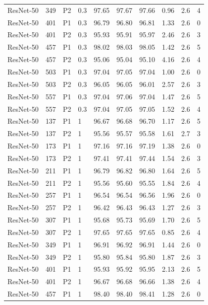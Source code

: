{\begin{longtable}{lrllrrrrrr}
ResNet-50 & 349 & P2 & 0.3 & 97.65 & 97.67 & 97.66 & 0.96 & 2.6 & 4 \\
ResNet-50 & 401 & P1 & 0.3 & 96.79 & 96.80 & 96.81 & 1.33 & 2.6 & 0 \\
ResNet-50 & 401 & P2 & 0.3 & 95.93 & 95.91 & 95.97 & 2.46 & 2.6 & 3 \\
ResNet-50 & 457 & P1 & 0.3 & 98.02 & 98.03 & 98.05 & 1.42 & 2.6 & 5 \\
ResNet-50 & 457 & P2 & 0.3 & 95.06 & 95.04 & 95.10 & 4.16 & 2.6 & 4 \\
ResNet-50 & 503 & P1 & 0.3 & 97.04 & 97.05 & 97.04 & 1.00 & 2.6 & 0 \\
ResNet-50 & 503 & P2 & 0.3 & 96.05 & 96.05 & 96.01 & 2.57 & 2.6 & 3 \\
ResNet-50 & 557 & P1 & 0.3 & 97.04 & 97.06 & 97.04 & 1.47 & 2.6 & 5 \\
ResNet-50 & 557 & P2 & 0.3 & 97.04 & 97.05 & 97.05 & 1.52 & 2.6 & 4 \\
ResNet-50 & 137 & P1 & 1 & 96.67 & 96.68 & 96.70 & 1.17 & 2.6 & 5 \\
ResNet-50 & 137 & P2 & 1 & 95.56 & 95.57 & 95.58 & 1.61 & 2.7 & 3 \\
ResNet-50 & 173 & P1 & 1 & 97.16 & 97.16 & 97.19 & 1.38 & 2.6 & 0 \\
ResNet-50 & 173 & P2 & 1 & 97.41 & 97.41 & 97.44 & 1.54 & 2.6 & 3 \\
ResNet-50 & 211 & P1 & 1 & 96.79 & 96.82 & 96.80 & 1.64 & 2.6 & 5 \\
ResNet-50 & 211 & P2 & 1 & 95.56 & 95.60 & 95.55 & 1.84 & 2.6 & 4 \\
ResNet-50 & 257 & P1 & 1 & 96.54 & 96.54 & 96.56 & 1.96 & 2.6 & 0 \\
ResNet-50 & 257 & P2 & 1 & 96.42 & 96.43 & 96.43 & 1.27 & 2.6 & 3 \\
ResNet-50 & 307 & P1 & 1 & 95.68 & 95.73 & 95.69 & 1.70 & 2.6 & 5 \\
ResNet-50 & 307 & P2 & 1 & 97.65 & 97.65 & 97.65 & 0.85 & 2.6 & 4 \\
ResNet-50 & 349 & P1 & 1 & 96.91 & 96.92 & 96.91 & 1.44 & 2.6 & 0 \\
ResNet-50 & 349 & P2 & 1 & 95.80 & 95.84 & 95.80 & 1.87 & 2.6 & 3 \\
ResNet-50 & 401 & P1 & 1 & 95.93 & 95.92 & 95.95 & 2.13 & 2.6 & 5 \\
ResNet-50 & 401 & P2 & 1 & 96.67 & 96.68 & 96.66 & 1.38 & 2.6 & 4 \\
ResNet-50 & 457 & P1 & 1 & 98.40 & 98.40 & 98.41 & 1.28 & 2.6 & 0 \\

\end{longtable}}
